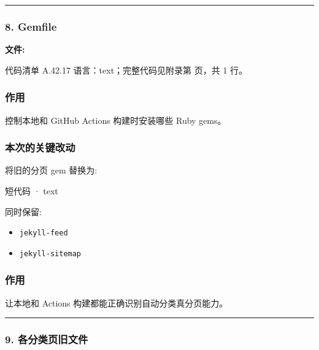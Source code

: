 \documentclass[lang=cn,scheme=chinese,color=blue,device=normal,toc=onecol,math=cm]{elegantbook}
\begin{document}
\medskip\hrule\medskip


\subsubsection{8. Gemfile}


\textbf{文件:}\par


\begin{codeindexbox}{代码清单 A.42.17}
语言：text；完整代码见附录第 \pageref{code:42:17} 页，共 1 行。
\end{codeindexbox}


\subsubsection{作用}


控制本地和 GitHub Actions 构建时安装哪些 Ruby gems。\par


\subsubsection{本次的关键改动}


将旧的分页 gem 替换为:\par


\begin{inlinecodebox}{短代码 · text}
\end{inlinecodebox}


同时保留:\par


\begin{itemize}
\item \texttt{jekyll-feed}
\item \texttt{jekyll-sitemap}
\end{itemize}


\subsubsection{作用}


让本地和 Actions 构建都能正确识别自动分类真分页能力。\par


\medskip\hrule\medskip


\subsubsection{9. 各分类页旧文件}
\end{document}
